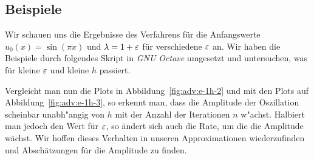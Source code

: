 

\subsection{Beispiele}

Wir schauen uns die Ergebnisse des Verfahrens für die Anfangswerte $u_0(x) = \sin(\pi x)$ und $\lambda = 1 + \varepsilon$ für verschiedene $\varepsilon$ an.
Wir haben die Beispiele durch folgendes Skript in \emph{GNU Octave} umgesetzt und untersuchen, was für kleine $\varepsilon$ und kleine $h$ passiert.

% 


Vergleicht man nun die Plots in Abbildung~\ref{fig:adv:e-1h-2} und mit den Plots auf Abbildung~\ref{fig:adv:e-1h-3}, so erkennt man, dass die Amplitude der Oszillation scheinbar unabh"angig von $h$ mit der Anzahl der Iterationen $n$ w"achst.
Halbiert man jedoch den Wert für $\varepsilon$, so ändert sich auch die Rate, um die die Amplitude wächst.
Wir hoffen dieses Verhalten in unseren Approximationen wiederzufinden und Abschätzungen für die Amplitude zu finden.


